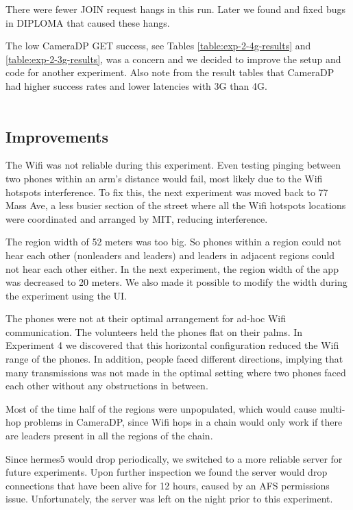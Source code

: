 There were fewer JOIN request hangs in this run. Later we found and fixed bugs in DIPLOMA that caused these hangs.

The low CameraDP GET success, see Tables \ref{table:exp-2-4g-results} and \ref{table:exp-2-3g-results}, was a concern and we decided to improve the setup and code for another experiment. Also note from the result tables that CameraDP had higher success rates and lower latencies with 3G than 4G.
\\
\\
\subsection{Improvements}
The Wifi was not reliable during this experiment. Even testing pinging between two phones within an arm's distance would fail, most likely due to the Wifi hotspots interference. To fix this, the next experiment was moved back to 77 Mass Ave, a less busier section of the street where all the Wifi hotspots locations were coordinated and arranged by MIT, reducing interference.

The region width of 52 meters was too big. So phones within a region could not hear each other (nonleaders and leaders) and leaders in adjacent regions could not hear each other either. In the next experiment, the region width of the app was decreased to 20 meters. We also made it possible to modify the width during the experiment using the UI.

The phones were not at their optimal arrangement for ad-hoc Wifi communication. The volunteers held the phones flat on their palms. In Experiment 4 we discovered that this horizontal configuration reduced the Wifi range of the phones. In addition, people faced different directions, implying that many transmissions was not made in the optimal setting where two phones faced each other without any obstructions in between.

Most of the time half of the regions were unpopulated, which would cause multi-hop problems in CameraDP, since Wifi hops in a chain would only work if there are leaders present in all the regions of the chain.

Since hermes5 would drop periodically, we switched to a more reliable server for future experiments. Upon further inspection we found the server would drop connections that have been alive for 12 hours, caused by an AFS permissions issue. Unfortunately, the server was left on the night prior to this experiment. 

